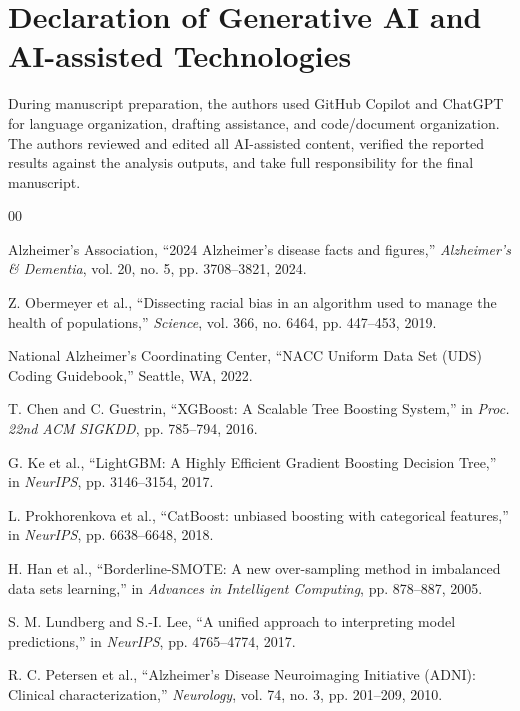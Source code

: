\documentclass[preprint,12pt]{elsarticle}
\begin{document}
\section*{Declaration of Generative AI and AI-assisted Technologies}
During manuscript preparation, the authors used GitHub Copilot and ChatGPT for language organization, drafting assistance, and code/document organization. The authors reviewed and edited all AI-assisted content, verified the reported results against the analysis outputs, and take full responsibility for the final manuscript.



\begin{thebibliography}{00}

 Alzheimer's Association, ``2024 Alzheimer's disease facts and figures,'' \textit{Alzheimer's \& Dementia}, vol. 20, no. 5, pp. 3708--3821, 2024.

 Z. Obermeyer et al., ``Dissecting racial bias in an algorithm used to manage the health of populations,'' \textit{Science}, vol. 366, no. 6464, pp. 447--453, 2019.

 National Alzheimer's Coordinating Center, ``NACC Uniform Data Set (UDS) Coding Guidebook,'' Seattle, WA, 2022.

 T. Chen and C. Guestrin, ``XGBoost: A Scalable Tree Boosting System,'' in \textit{Proc. 22nd ACM SIGKDD}, pp. 785--794, 2016.

 G. Ke et al., ``LightGBM: A Highly Efficient Gradient Boosting Decision Tree,'' in \textit{NeurIPS}, pp. 3146--3154, 2017.

 L. Prokhorenkova et al., ``CatBoost: unbiased boosting with categorical features,'' in \textit{NeurIPS}, pp. 6638--6648, 2018.

 H. Han et al., ``Borderline-SMOTE: A new over-sampling method in imbalanced data sets learning,'' in \textit{Advances in Intelligent Computing}, pp. 878--887, 2005.

 S. M. Lundberg and S.-I. Lee, ``A unified approach to interpreting model predictions,'' in \textit{NeurIPS}, pp. 4765--4774, 2017.

 R. C. Petersen et al., ``Alzheimer's Disease Neuroimaging Initiative (ADNI): Clinical characterization,'' \textit{Neurology}, vol. 74, no. 3, pp. 201--209, 2010.


\end{thebibliography}
\end{document}
